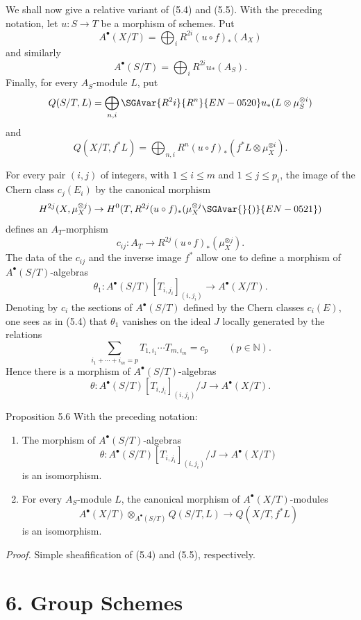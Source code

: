 We shall now give a relative variant of (5.4) and (5.5). With the preceding notation, let $u:S\to T$ be a morphism of schemes. Put
\[
A^\bullet(X/T)=\bigoplus_i R^{2i}(u\circ f)_*(A_X)
\]
and similarly
\[
A^\bullet(S/T)=\bigoplus_i R^{2i}u_*(A_S).
\]
Finally, for every $A_S$-module $L$, put
\[
Q(S/T,L)=\bigoplus_{n,i}\SGAvar{R^2i}{R^n}{EN-0520} u_*(L\otimes\mu_S^{\otimes i})
\]
and
\[
Q(X/T,f^*L)=\bigoplus_{n,i}R^n(u\circ f)_*(f^*L\otimes\mu_X^{\otimes i}).
\]

For every pair $(i,j)$ of integers, with $1\le i\le m$ and $1\le j\le p_i$, the image of the Chern class $c_j(E_i)$ by the canonical morphism
\[
H^{2j}(X,\mu_X^{\otimes j})
\to H^0(T,R^{2j}(u\circ f)_*(\mu_X^{\otimes j}\SGAvar{}{)}{EN-0521})
\]
defines an $A_T$-morphism
\[
c_{ij}:A_T\to R^{2j}(u\circ f)_*(\mu_X^{\otimes j}).
\]
The data of the $c_{ij}$ and the inverse image $f^*$ allow one to define a morphism of $A^\bullet(S/T)$-algebras
\[
\theta_1:A^\bullet(S/T)[T_{i,j_i}]_{(i,j_i)}\to A^\bullet(X/T).
\]
Denoting by $c_i$ the sections of $A^\bullet(S/T)$ defined by the Chern classes $c_i(E)$, one sees as in (5.4) that $\theta_1$ vanishes on the ideal $J$ locally generated by the relations
\[
\sum_{i_1+\cdots+i_m=p}T_{1,i_1}\cdots T_{m,i_m}=c_p\qquad(p\in\mathbb N).
\]
Hence there is a morphism of $A^\bullet(S/T)$-algebras
\[
\theta:A^\bullet(S/T)[T_{i,j_i}]_{(i,j_i)}/J\to A^\bullet(X/T).
\]

\begin{statement}{Proposition 5.6}
With the preceding notation:
\begin{enumerate}[label=\alph*)]
\item The morphism of $A^\bullet(S/T)$-algebras
\[
\theta:A^\bullet(S/T)[T_{i,j_i}]_{(i,j_i)}/J\to A^\bullet(X/T)
\]
is an isomorphism.
\item For every $A_S$-module $L$, the canonical morphism of $A^\bullet(X/T)$-modules
\[
A^\bullet(X/T)\otimes_{A^\bullet(S/T)}Q(S/T,L)\to Q(X/T,f^*L)
\]
is an isomorphism.
\end{enumerate}
\end{statement}

\emph{Proof.} Simple sheafification of (5.4) and (5.5), respectively.

\section*{6. Group Schemes}

